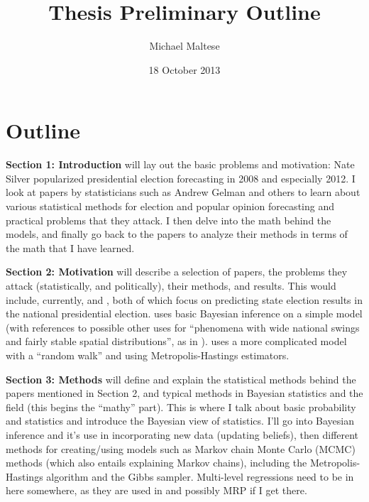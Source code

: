 \documentclass[12pt]{article}
\begin{document}
\title{\textbf{Thesis Preliminary Outline}}
\author{Michael Maltese}
\date{18 October 2013}
\maketitle

\section*{Outline}

\textbf{Section 1: Introduction} will lay out the basic problems and motivation: Nate Silver \citeyearpar{Silver:2012aa} popularized presidential election forecasting in 2008 and especially 2012. I look at papers by statisticians such as Andrew Gelman and others to learn about various statistical methods for election and popular opinion forecasting and practical problems that they attack. I then delve into the math behind the models, and finally go back to the papers to analyze their methods in terms of the math that I have learned.

\textbf{Section 2: Motivation} will describe a selection of papers, the problems they attack (statistically, and politically), their methods, and results. This would include, currently, \citet{Lock:2010aa} and \citet{Strauss:2007aa}, both of which focus on predicting state election results in the national presidential election. \citet{Lock:2010aa} uses basic Bayesian inference on a simple model (with references to possible other uses for ``phenomena with wide national swings and fairly stable spatial distributions'', as in \citealp{Lax:2009aa}). \citet{Strauss:2007aa} uses a more complicated model with a ``random walk'' and using Metropolis-Hastings estimators.

\textbf{Section 3: Methods} will define and explain the statistical methods behind the papers mentioned in Section 2, and typical methods in Bayesian statistics and the field (this begins the ``mathy'' part). This is where I talk about basic probability and statistics and introduce the Bayesian view of statistics. I'll go into Bayesian inference and it's use in incorporating new data (updating beliefs), then different methods for creating/using models such as Markov chain Monte Carlo (MCMC) methods (which also entails explaining Markov chains), including the Metropolis-Hastings algorithm and the Gibbs sampler. Multi-level regressions need to be in here somewhere, as they are used in \citet{Lock:2010aa} and possibly MRP \citep{Ghitza:2013aa} if I get there.
\end{document}
